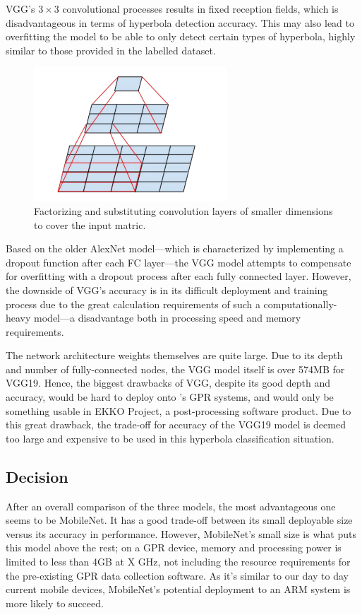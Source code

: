 \documentclass[se,blockletter]{uw-wkrpt}
\begin{document}
VGG's $3 \times 3$ convolutional processes results in fixed reception fields, which is disadvantageous in terms of hyperbola detection accuracy. This may also lead to overfitting the model to be able to only detect certain types of hyperbola, highly similar to those provided in the labelled dataset.

\begin{figure}
  \centering
  \includegraphics[height=5cm]{convolution-substitution}
  \caption{Factorizing and substituting convolution layers of smaller dimensions to cover the input matric.~\cite{ref:}}
  \label{fig:convolution-substitution}
\end{figure}

Based on the older AlexNet model---which is characterized by implementing a dropout function after each FC layer---the VGG model attempts to compensate for overfitting with a dropout process after each fully connected layer. However, the downside of VGG's accuracy is in its difficult deployment and training process due to the great calculation requirements of such a computationally-heavy model---a disadvantage both in processing speed and memory requirements. 

The network architecture weights themselves are quite large. Due to its depth and number of fully-connected nodes, the VGG model itself is over 574MB for VGG19. Hence, the biggest drawbacks of VGG, despite its good depth and accuracy, would be hard to deploy onto \thecompany{}'s GPR systems, and would only be something usable in EKKO Project, a post-processing software product. Due to this great drawback, the trade-off for accuracy of the VGG19 model is deemed too large and expensive to be used in this hyperbola classification situation.

\subsection{Decision}
After an overall comparison of the three models, the most advantageous one seems to be MobileNet. It has a good trade-off between its small deployable size versus its accuracy in performance. However, MobileNet's small size is what puts this model above the rest; on a GPR device, memory and processing power is limited to less than 4GB at X GHz, not including the resource requirements for the pre-existing GPR data collection software. As it's similar to our day to day current mobile devices, MobileNet's potential deployment to an ARM system is more likely to succeed.
\end{document}
